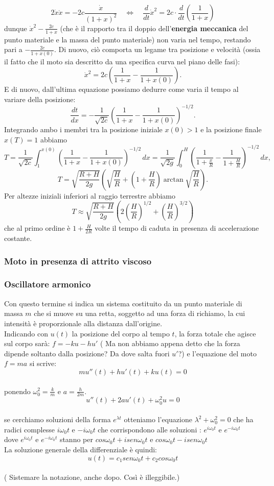 \documentclass[a4paper,twoside]{article}
\theoremstyle{definition}
\numberwithin{theorem}{section}
\begin{document}
$$ 2\dot{x}\ddot{x} = -2c\frac{\dot{x}}{(1+x)^2}\quad\Longleftrightarrow\quad \frac{d}{dt}\dot{x}^2 = 2c\cdot\frac{d}{dt}\left(\frac{1}{1+x}\right) $$
dunque $\dot{x}^2-\frac{2c}{1+x}$ (che è il rapporto tra il doppio dell'\textbf{energia meccanica} del punto materiale e la massa del punto materiale) non varia nel tempo, restando pari a $-\frac{2c}{1+x(0)}$. Di nuovo, ciò comporta un legame tra posizione e velocità (ossia il fatto che il moto sia descritto da una specifica curva nel piano delle fasi):
$$ \dot{x}^2 = 2c\left(\frac{1}{1+x}-\frac{1}{1+x(0)}\right). $$
E di nuovo, dall'ultima equazione possiamo dedurre come varia il tempo al variare della posizione:
$$ \frac{dt}{dx} = -\frac{1}{\sqrt{2c}}\left(\frac{1}{1+x}-\frac{1}{1+x(0)}\right)^{-1/2}. $$
Integrando ambo i membri tra la posizione iniziale $x(0)>1$ e la posizione finale $x(T)=1$ abbiamo 
$$ T = \frac{1}{\sqrt{2c}}\int_{1}^{x(0)}\left(\frac{1}{1+x}-\frac{1}{1+x(0)}\right)^{-1/2}\,dx=\frac{1}{\sqrt{2g}}\int_{0}^{H}\left(\frac{1}{1+\frac{x}{R}}-\frac{1}{1+\frac{H}{R}}\right)^{-1/2}\,dx,$$
$$T=\sqrt{\frac{R+H}{2g}}\left(\sqrt{\frac{H}{R}}+\left(1+\frac{H}{R}\right)\arctan\sqrt{\frac{H}{R}}\right). $$
Per altezze iniziali inferiori al raggio terrestre abbiamo
$$T\approx \sqrt{\frac{R+H}{2g}}\left(2\left(\frac{H}{R}\right)^{1/2}+\left(\frac{H}{R}\right)^{3/2}\right) $$
che al primo ordine è $1+\frac{H}{2R}$ volte il tempo di caduta in presenza di accelerazione costante.

\subsubsection{Moto in presenza di attrito viscoso}

\subsubsection{Oscillatore armonico}
Con questo termine si indica un sistema costituito da un punto materiale di massa $m$ che si muove su una retta, soggetto ad una forza di richiamo, la cui intensità è proporzionale alla distanza dall'origine. \\
Indicando con $u(t)$ la posizione del corpo al tempo $t$, la forza totale che agisce sul corpo sarà: $f=-ku-hu'$ ({\color{red} Ma non abbiamo appena detto che la forza dipende soltanto dalla posizione? Da dove salta fuori $u'$?}) e l'equazione del moto $f=ma$ si scrive: $$mu''(t)+hu'(t)+ku(t)=0$$\\
ponendo $\omega_0^2=\frac{k}{m}$ e $a=\frac{h}{2m}$.\\
$$u''(t)+2au'(t)+\omega_0^2u=0$$ \\
se cerchiamo soluzioni della forma $e^{\lambda t}$ otteniamo l'equazione $\lambda^2 + \omega_0^2=0$ che ha radici complesse $i\omega_0t$ e $-i\omega_0t$ che corrispondono alle soluzioni : $e^{i\omega_0t}$ e $e^{-i\omega_0t}$\\
dove  $e^{i\omega_0t}$ e $e^{-i\omega_0t}$ stanno per $cos\omega_0t+isen\omega_0t$ e $cos\omega_0t-isen\omega_0t$ \\
La soluzione generale della differenziale è quindi: $$u(t)=c_1sen\omega_0t+c_2cos\omega_0t$$\\
({\color{red} Sistemare la notazione, anche dopo. Così è illeggibile.})
\end{document}
